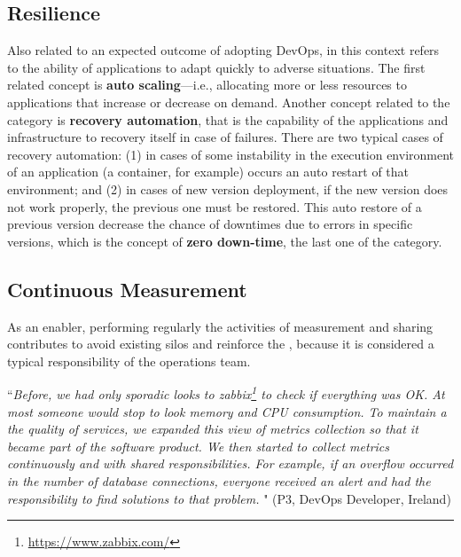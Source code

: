 \subsection*{Resilience}

Also related to an expected outcome of adopting DevOps,  in this
context refers to the ability of applications to adapt quickly to adverse situations.
The first related concept is \textbf{auto scaling}---i.e.,
allocating more or less resources to applications that increase or
decrease on demand. Another concept related to
the  category is \textbf{recovery automation}, that is
the capability of the applications and infrastructure to recovery itself in case of
failures. There are two typical cases of recovery automation: (1) in cases
of some instability in the execution environment of an application (a
container, for example) occurs an auto restart of that environment; and (2) in
cases of new version deployment, if the new version does not work properly, the
previous one must be restored. This auto restore of a previous version
decrease the chance of downtimes due to errors in specific versions, which
is the concept of \textbf{zero down-time}, the last one of the  category.



\subsection{Continuous Measurement}

As an enabler, performing regularly the
activities of measurement and sharing
contributes to avoid existing silos and reinforce the \cc, because it is
considered a typical responsibility of the operations team.

\begin{mq}
``\emph{Before, we had only sporadic looks to
zabbix\footnote{\url{https://www.zabbix.com/}} to check if everything was OK.
At most someone would stop to look memory and CPU consumption. To maintain a
the quality of services, we expanded this view of metrics collection so that it
became part of the software product. We then started to collect metrics continuously
and with shared responsibilities. For example, if an overflow occurred in the
number of database connections, everyone received an alert and had
the responsibility to find solutions to that problem. %
}" (P3, DevOps Developer, Ireland)
\end{mq}

